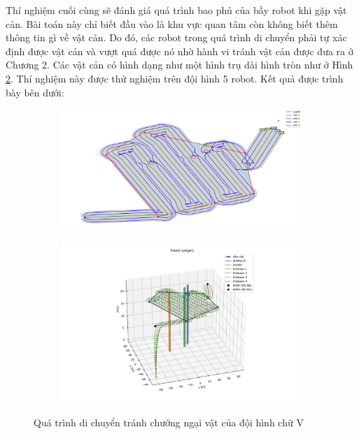 Thí nghiệm cuối cùng sẽ đánh giá quá trình bao phủ của bầy robot khi gặp vật cản. Bài toán này chỉ biết đầu vào là khu vực quan tâm còn không biết thêm thông tin gì về vật cản. Do đó, các robot trong quá trình di chuyển phải tự xác định được vật cản và vượt quá được nó nhờ hành vi tránh vật cản được đưa ra ở Chương 2. Các vật cản có hình dạng như một hình trụ dài hình tròn như ở Hình \ref{fig:obs3d}. Thí nghiệm này được thử nghiệm trên đội hình 5 robot. Kết quả được trình bày bên dưới: 
\begin{figure}[H]
\centering
    \begin{subfigure}[b]{0.48\textwidth}
    \centering
    \includegraphics[width=\textwidth]{chapter5/image/obs.png}
    \caption{}
    \label{fig:obs}
    \end{subfigure}
    \begin{subfigure}[b]{0.49\textwidth}
    \centering 
    \includegraphics[width=\textwidth]{chapter5/image/obs3d.png}
    \caption{}
    \label{fig:obs3d}
    \end{subfigure}
    \caption{Quá trình di chuyển tránh chướng ngại vật của đội hình chữ V }
    \label{fig:5Robots}
\end{figure}


